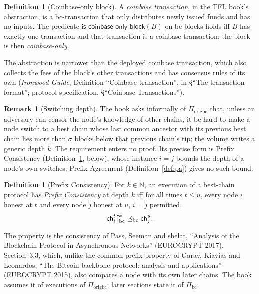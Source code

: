 \documentclass[11pt,a4paper]{article}
\theoremstyle{definition}
\newtheorem{definition}[theorem]{Definition}
\newtheorem{remark}[theorem]{Remark}
\newcommand{\N}{\mathbb{N}}
\newcommand{\bc}{\mathrm{bc}}
\newcommand{\ch}{\mathsf{ch}}
\newcommand{\Piorigbc}{\Pi_{\mathrm{origbc}}}
\newcommand{\Pibc}{\Pi_{\bc}}
\newcommand{\iscoinbaseonlyblock}{\mathsf{is\text{-}coinbase\text{-}only\text{-}block}}
\begin{document}
\begin{definition}[Coinbase-only block]\label{def:coinbase-only}
A \emph{coinbase transaction}, in the TFL book's abstraction, is a
bc-transaction that only distributes newly issued funds and has no inputs.
The predicate $\iscoinbaseonlyblock(B)$ on bc-blocks holds iff $B$ has
exactly one transaction and that transaction is a coinbase transaction; the
block is then \emph{coinbase-only}.
\end{definition}

The abstraction is narrower than the deployed coinbase transaction, which
also collects the fees of the block's other transactions and has consensus
rules of its own (\emph{Ironwood Guide}, Definition ``Coinbase
transaction'', in \S``The transaction format''; protocol specification,
\S``Coinbase Transactions'').

\begin{remark}[Switching depth]\label{rem:bc-switch}
The book asks informally of $\Piorigbc$ that, unless an adversary can censor
the node's knowledge of other chains, it be hard to make a node switch to a
best chain whose last common ancestor with its previous best chain lies more
than $\sigma$ blocks below that previous chain's tip; the volume writes a
generic depth $k$. The requirement enters no proof. Its precise form is
Prefix Consistency (Definition~\ref{def:pc}, below), whose instance $i = j$
bounds the depth of a node's own switches; Prefix Agreement
(Definition~\ref{def:pa}) gives no such bound.
\end{remark}

\begin{definition}[Prefix Consistency]\label{def:pc}
For $k \in \N$, an execution of a best-chain protocol has \emph{Prefix
Consistency} at depth $k$ iff for all times $t \le u$, every node $i$ honest
at $t$ and every node $j$ honest at $u$, $i = j$ permitted,
\begin{gather*}
  \ch_i^t\trunc[\bc]{k} \preceq_{\bc} \ch_j^u .
\end{gather*}
\end{definition}

The property is the consistency of Pass, Seeman and shelat, ``Analysis of the
Blockchain Protocol in Asynchronous Networks'' (EUROCRYPT 2017), Section~3.3,
which, unlike the common-prefix property of Garay, Kiayias and Leonardos,
``The Bitcoin backbone protocol: analysis and applications'' (EUROCRYPT
2015), also compares a node with its own later chains. The book
assumes it of executions of $\Piorigbc$; later sections state it of $\Pibc$.
\end{document}
